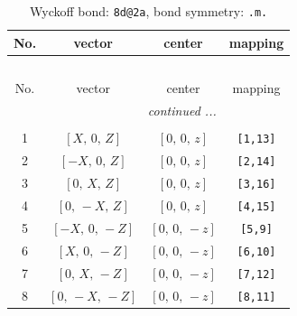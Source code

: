 \documentclass[fleqn,8pt]{jsarticle}
\begin{document}
\begin{longtable}{cccc}
\caption{Wyckoff bond: {\tt 8d@2a}, bond symmetry: {\tt .m.}}
 \\
 \hline \hline
No. & vector & center & mapping \\ \hline \endfirsthead

\multicolumn{3}{l}{\tablename\ \thetable{}} \\
 \hline \hline
No. & vector & center & mapping \\ \hline \endhead

 \hline \hline
\multicolumn{3}{r}{\footnotesize\it continued ...} \\ \endfoot

 \hline \hline
\multicolumn{3}{r}{} \\ \endlastfoot

1 & $\left[ X,\, 0,\, Z \right]$ & $\left[ 0,\, 0,\, z \right]$ & {\tt [1,13]} \\ \hline
2 & $\left[ - X,\, 0,\, Z \right]$ & $\left[ 0,\, 0,\, z \right]$ & {\tt [2,14]} \\ \hline
3 & $\left[ 0,\, X,\, Z \right]$ & $\left[ 0,\, 0,\, z \right]$ & {\tt [3,16]} \\ \hline
4 & $\left[ 0,\, - X,\, Z \right]$ & $\left[ 0,\, 0,\, z \right]$ & {\tt [4,15]} \\ \hline
5 & $\left[ - X,\, 0,\, - Z \right]$ & $\left[ 0,\, 0,\, - z \right]$ & {\tt [5,9]} \\ \hline
6 & $\left[ X,\, 0,\, - Z \right]$ & $\left[ 0,\, 0,\, - z \right]$ & {\tt [6,10]} \\ \hline
7 & $\left[ 0,\, X,\, - Z \right]$ & $\left[ 0,\, 0,\, - z \right]$ & {\tt [7,12]} \\ \hline
8 & $\left[ 0,\, - X,\, - Z \right]$ & $\left[ 0,\, 0,\, - z \right]$ & {\tt [8,11]} \\
\end{longtable}
\renewcommand{\arraystretch}{1.2}
\end{document}
